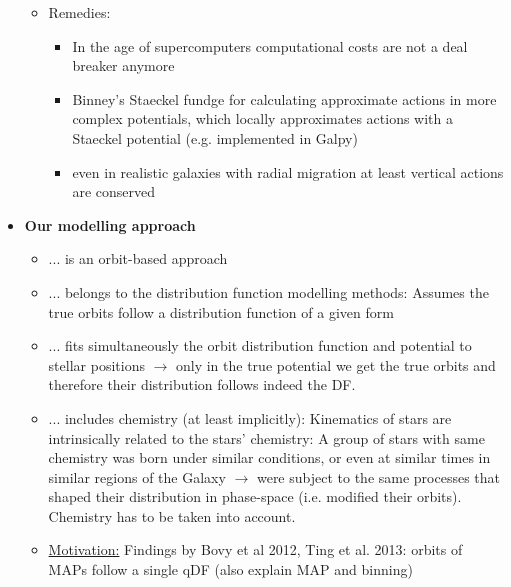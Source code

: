 \begin{itemize}
\begin{itemize}
\begin{itemize}
\end{itemize}
\item Remedies:
\begin{itemize}
\item In the age of supercomputers computational costs are not a deal breaker anymore
\item Binney's Staeckel fundge for calculating approximate actions in more complex potentials, which locally approximates actions with a Staeckel potential (e.g. implemented in Galpy)
\item even in realistic galaxies with radial migration at least vertical actions are conserved
\end{itemize} 
\end{itemize}

\item \textbf{Our modelling approach}
\begin{itemize}
\item ... is an orbit-based approach
\item ... belongs to the distribution function modelling methods: Assumes the true orbits follow a distribution function of a given form
\item ... fits simultaneously the orbit distribution function and potential to stellar positions $\rightarrow$ only in the true potential we get the true orbits and therefore their distribution follows indeed the DF.
\item ... includes chemistry (at least implicitly): Kinematics of stars are intrinsically related to the stars' chemistry: A group of stars with same chemistry was born under similar conditions, or even at similar times in similar regions of the Galaxy $\rightarrow$ were subject to the same processes that shaped their distribution in phase-space (i.e. modified their orbits). Chemistry has to be taken into account.
\item \underline{Motivation:} Findings by Bovy et al 2012, Ting et al. 2013: orbits of MAPs follow a single qDF (also explain MAP and binning)
\begin{scriptsize}
\begin{itemize}

\end{itemize}
\end{scriptsize}
\end{itemize}
\end{itemize}
